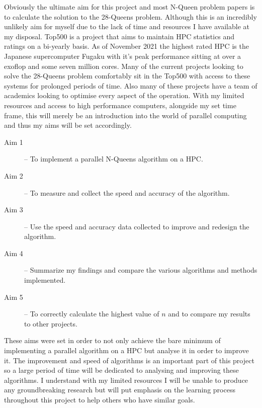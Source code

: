 Obviously the ultimate aim for this project and most N-Queen problem papers is to calculate the solution to the 28-Queens problem. Although this is an incredibly unlikely aim for myself due to the lack of time and resources I have available at my disposal. Top500 is a project that aims to maintain HPC statistics and ratings on a bi-yearly basis\cite{top500}. As of November 2021 the highest rated HPC is the Japanese supercomputer Fugaku with it's peak performance sitting at over a exoflop and some seven million cores\cite{top500fug}. Many of the current projects looking to solve the 28-Queens problem comfortably sit in the Top500 with access to these systems for prolonged periods of time. Also many of these projects have a team of academics looking to optimise every aspect of the operation. With my limited resources and access to high performance computers, alongside my set time frame, this will merely be an introduction into the world of parallel computing and thus my aims will be set accordingly. 
\begin{description}
\item[Aim 1] -- To implement a parallel N-Queens algorithm on a HPC.
\item[Aim 2] -- To measure and collect the speed and accuracy of the algorithm.
\item[Aim 3] -- Use the speed and accuracy data collected to improve and redesign the algorithm.
\item[Aim 4] -- Summarize my findings and compare the various algorithms and methods implemented.
\item[Aim 5] -- To correctly calculate the highest value of \(n\) and to compare my results to other projects.  
\end{description}
These aims were set in order to not only achieve the bare minimum of implementing a parallel algorithm on a HPC but analyse it in order to improve it. The improvement and speed of algorithms is an important part of this project so a large period of time will be dedicated to analysing and improving these algorithms. I understand with my limited resources I will be unable to produce any groundbreaking research but will put emphasis on the learning process throughout this project to help others who have similar goals. 